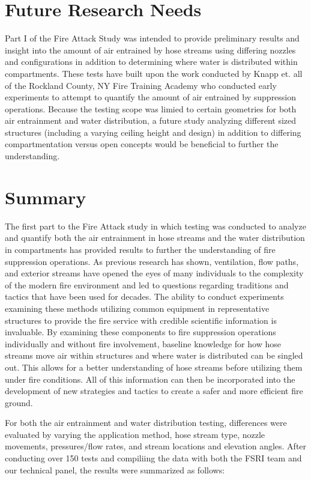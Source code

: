 \documentclass{article}
\begin{document}
\section{Future Research Needs}

Part I of the Fire Attack Study was intended to provide preliminary results and insight into the amount of air entrained by hose streams using differing nozzles and configurations in addition to determining where water is distributed within compartments. These tests have built upon the work conducted by Knapp et. all of the Rockland County, NY Fire Training Academy who conducted early experiments to attempt to quantify the amount of air entrained by suppression operations. Because the testing scope was limied to certain geometries for both air entrainment and water distribution, a future study analyzing different sized structures (including a varying ceiling height and design) in addition to differing compartmentation versus open concepts would be beneficial to further the understanding.

\clearpage

\section{Summary}

The first part to the Fire Attack study in which testing was conducted to analyze and quantify both the air entrainment in hose streams and the water distribution in compartments has provided results to further the understanding of fire suppression operations. As previous research has shown, ventilation, flow paths, and exterior streams have opened the eyes of many individuals to the complexity of the modern fire environment and led to questions regarding traditions and tactics that have been used for decades. The ability to conduct experiments examining these methods utilizing common equipment in representative structures to provide the fire service with credible scientific information is invaluable. By examining these components to fire suppression operations individually and without fire involvement, baseline knowledge for how hose streams move air within structures and where water is distributed can be singled out. This allows for a better understanding of hose streams before utilizing them under fire conditions. All of this information can then be incorporated into the development of new strategies and tactics to create a safer and more efficient fire ground.

For both the air entrainment and water distribution testing, differences were evaluated by varying the application method, hose stream type, nozzle movements, pressures/flow rates, and stream locations and elevation angles. After conducting over 150 tests and compiliing the data with both the FSRI team and our technical panel, the results were summarized as follows:
\end{document}
